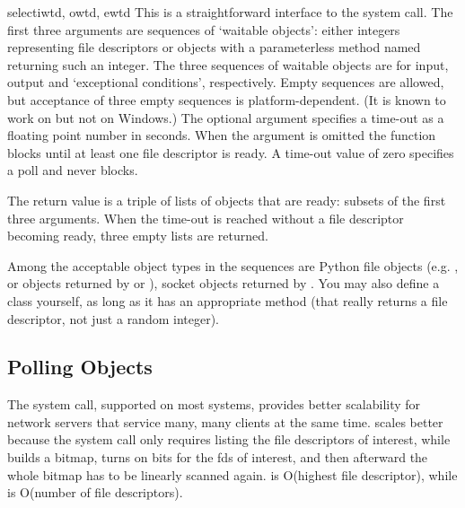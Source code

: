 \begin{funcdesc}{select}{iwtd, owtd, ewtd}
This is a straightforward interface to the \UNIX{} 
system call.  The first three arguments are sequences of `waitable
objects': either integers representing file descriptors or
objects with a parameterless method named  returning
such an integer.  The three sequences of waitable objects are for input,
output and `exceptional conditions', respectively.  Empty sequences are
allowed, but acceptance of three empty sequences is platform-dependent.
(It is known to work on \UNIX{} but not on Windows.)  The optional
 argument specifies a time-out as a floating point number
in seconds.  When the  argument is omitted the function
blocks until at least one file descriptor is ready.  A time-out value
of zero specifies a poll and never blocks.

The return value is a triple of lists of objects that are ready:
subsets of the first three arguments.  When the time-out is reached
without a file descriptor becoming ready, three empty lists are
returned.

Among the acceptable object types in the sequences are Python file
objects (e.g. , or objects returned by
 or ), socket objects
returned by .%
You may also define a  class yourself, as long as it has
an appropriate  method (that really returns a file
descriptor, not just a random integer).
\end{funcdesc}

\subsection{Polling Objects
            \label{poll-objects}}

The  system call, supported on most \UNIX{} systems,
provides better scalability for network servers that service many,
many clients at the same time.
 scales better because the system call only
requires listing the file descriptors of interest, while 
builds a bitmap, turns on bits for the fds of interest, and then
afterward the whole bitmap has to be linearly scanned again.
 is O(highest file descriptor), while
 is O(number of file descriptors).

